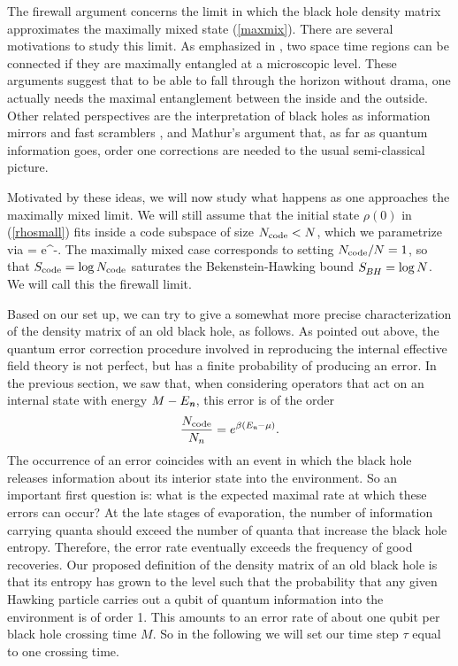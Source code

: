 \documentclass[12pt]{article}%
\def\be{\begin{equation}}
\def\ee{\end{equation}}
\begin{document}
The firewall argument  concerns the limit in  which the black hole density matrix  approximates the maximally mixed state (\ref{maxmix}). 
There are several motivations to study this limit. As emphasized in \cite{vanraamsdonk}, 
two  space time regions can be connected if they are maximally entangled at a microscopic level. 
These arguments suggest that to be able to fall through 
the horizon without drama, one actually needs the maximal entanglement between the inside and the outside. 
 Other related perspectives are the interpretation 
of black holes as information mirrors \cite{haydenpreskill}and fast scramblers \cite{fastscrambler},   and Mathur's argument that, 
as far as quantum information goes, order one corrections are needed to the usual semi-classical picture.  



Motivated by these ideas, we will now study what happens as one approaches
the maximally mixed limit.
We will still assume that the initial state $\rho(0)$ in (\ref{rhosmall}) fits inside a code subspace of size ${N_{\rm code}} < N$, which we parametrize via 
\bea
\label{rationc}
 = e^{-\beta\mu}.
\eea
The maximally mixed case corresponds to setting $N_{\rm code}/N=1$, so
that $S_{\rm code} = \log N_{\rm code}$ saturates the Bekenstein-Hawking bound $S_\BH = \log N$. We will call this the firewall limit.



Based on our set up, we can try to give a somewhat more precise characterization of the density matrix of an old black hole, as follows.
As pointed out above, the quantum error correction procedure involved in reproducing the internal effective field  theory is not perfect,
but has a finite probability of producing an error.   
In the previous section, we saw that,  when considering operators that act on an internal state with energy $M-E_{ \textit{\textbf n}}$, this error is of the order
\be
\label{rationce}
\frac{N_{\rm code}}{N_n} = e^{\beta(E_\nom-\mu)}.
\ee
The occurrence of an error coincides with an event in which the black hole releases information about its interior state into the environment.
So an important first question is:  what is the expected maximal rate at which these errors can occur?  At the late stages of evaporation, 
the number of information carrying  quanta should exceed the number of quanta that increase the black hole entropy.  Therefore, the error rate 
eventually exceeds the frequency of good recoveries. Our proposed definition of the density matrix of an old black hole is that its entropy has grown 
to the level such that the probability that any given Hawking particle carries out a qubit of quantum information into the environment is of order 1.  
This amounts to an error rate  of about one qubit  per black hole crossing time $M$.  So in the following we will set our time step $\tau$ equal to one crossing time.
\end{document}
